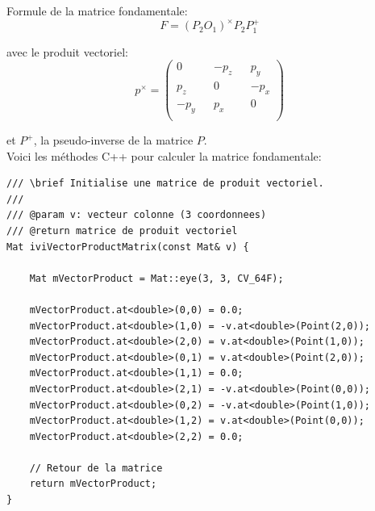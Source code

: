 \documentclass[a4paper,11pt]{article}
\begin{document}
Formule de la matrice fondamentale:
$$
F = (P_2 O_1)^{\times} P_2 P_1^+
$$

avec le produit vectoriel:
$$
p^{\times} = 
\begin{pmatrix}
  0 && -p_z && p_y \\
  p_z && 0 && -p_x \\
  -p_y && p_x && 0 \\
\end{pmatrix}
$$

et $P^+$, la pseudo-inverse de la matrice $P$.\\

Voici les méthodes C++ pour calculer la matrice fondamentale:

\begin{lstlisting}[caption=Fontion qui calcul le produit vectoriel]
/// \brief Initialise une matrice de produit vectoriel.
///
/// @param v: vecteur colonne (3 coordonnees)
/// @return matrice de produit vectoriel
Mat iviVectorProductMatrix(const Mat& v) {

    Mat mVectorProduct = Mat::eye(3, 3, CV_64F);

    mVectorProduct.at<double>(0,0) = 0.0;
    mVectorProduct.at<double>(1,0) = -v.at<double>(Point(2,0));
    mVectorProduct.at<double>(2,0) = v.at<double>(Point(1,0));
    mVectorProduct.at<double>(0,1) = v.at<double>(Point(2,0));
    mVectorProduct.at<double>(1,1) = 0.0;
    mVectorProduct.at<double>(2,1) = -v.at<double>(Point(0,0));
    mVectorProduct.at<double>(0,2) = -v.at<double>(Point(1,0));
    mVectorProduct.at<double>(1,2) = v.at<double>(Point(0,0));
    mVectorProduct.at<double>(2,2) = 0.0;

    // Retour de la matrice
    return mVectorProduct;
}
\end{lstlisting}
\end{document}
